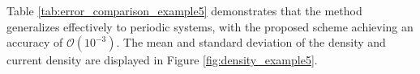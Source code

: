 \documentclass[preprint,11pt]{elsarticle}
\newcommand{\ZY}[1]{\textcolor{orange}{~#1}}
\begin{document}
Table \ref{tab:error_comparison_example5} demonstrates that the method generalizes effectively to periodic systems, with the proposed scheme achieving an accuracy of $\mathcal{O}(10^{-3})$. The mean and standard deviation of the density and current density are displayed in Figure \ref{fig:density_example5}.





\begin{table}[!htbp]
\centering
\caption{Error comparison for Example 4.}
\label{tab:error_comparison_example5}
\renewcommand{\arraystretch}{1.2}
\end{table}
\end{document}
